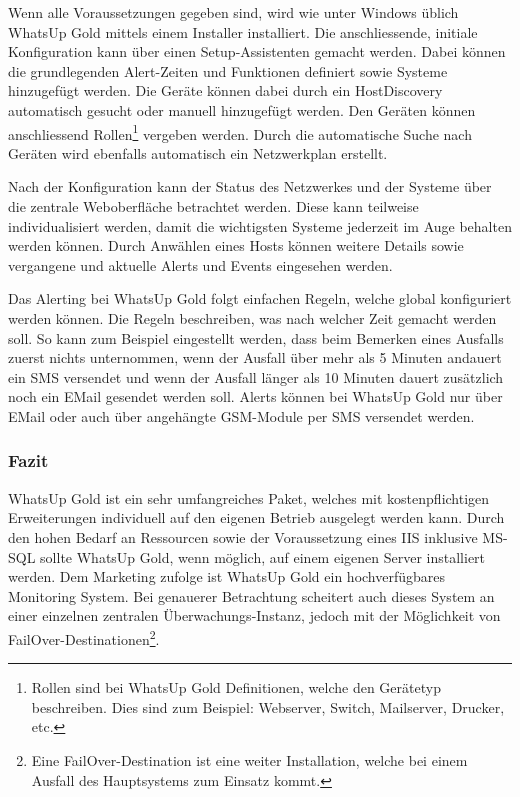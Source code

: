   Wenn alle Voraussetzungen gegeben sind, wird wie unter Windows \"ublich WhatsUp Gold mittels einem Installer installiert. Die anschliessende, initiale Konfiguration kann \"uber einen Setup-Assistenten gemacht werden. Dabei k\"onnen die grundlegenden Alert-Zeiten und Funktionen definiert sowie Systeme hinzugef\"ugt werden. Die Ger\"ate k\"onnen dabei durch ein HostDiscovery automatisch gesucht oder manuell hinzugef\"ugt werden. Den Ger\"aten k\"onnen anschliessend Rollen\footnote{\label{foot:wug-roles}Rollen sind bei WhatsUp Gold Definitionen, welche den Ger\"atetyp beschreiben. Dies sind zum Beispiel: Webserver, Switch, Mailserver, Drucker, etc.} vergeben werden. Durch die automatische Suche nach Ger\"aten wird ebenfalls automatisch ein Netzwerkplan erstellt.

  Nach der Konfiguration kann der Status des Netzwerkes und der Systeme \"uber die zentrale Weboberfl\"ache betrachtet werden. Diese kann teilweise individualisiert werden, damit die wichtigsten Systeme jederzeit im Auge behalten werden k\"onnen. Durch Anw\"ahlen eines Hosts k\"onnen weitere Details sowie vergangene und aktuelle Alerts und Events eingesehen werden.

  Das Alerting bei WhatsUp Gold folgt einfachen Regeln, welche global konfiguriert werden k\"onnen. Die Regeln beschreiben, was nach welcher Zeit gemacht werden soll. So kann zum Beispiel eingestellt werden, dass beim Bemerken eines Ausfalls zuerst nichts unternommen, wenn der Ausfall \"uber mehr als 5 Minuten andauert ein SMS versendet und wenn der Ausfall l\"anger als 10 Minuten dauert zus\"atzlich noch ein EMail gesendet werden soll. Alerts k\"onnen bei WhatsUp Gold nur \"uber EMail oder auch \"uber angeh\"angte GSM-Module per SMS versendet werden.

\subsubsection{Fazit} \label{sec:systeme-wug-fazit}
  WhatsUp Gold ist ein sehr umfangreiches Paket, welches mit kostenpflichtigen Erweiterungen individuell auf den eigenen Betrieb ausgelegt werden kann. Durch den hohen Bedarf an Ressourcen sowie der Voraussetzung eines IIS inklusive MS-SQL sollte WhatsUp Gold, wenn m\"oglich, auf einem eigenen Server installiert werden. Dem Marketing zufolge ist WhatsUp Gold ein hochverf\"ugbares Monitoring System. Bei genauerer Betrachtung scheitert auch dieses System an einer einzelnen zentralen \"Uberwachungs-Instanz, jedoch mit der M\"oglichkeit von FailOver-Destinationen\footnote{Eine FailOver-Destination ist eine weiter Installation, welche bei einem Ausfall des Hauptsystems zum Einsatz kommt.}.


